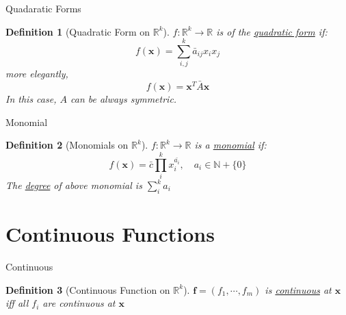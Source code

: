\documentclass[a4paper,11pt]{article}
\newtheorem{defn}{Definition}
\begin{document}
\begin{frame}[t]{Quadaratic Forms}
	\begin{defn}
		[Quadratic Form on $\mathbb{R}^k$]
		$f:\mathbb{R}^k\rightarrow\mathbb{R}$ is of the \uline{quadratic form} if:
		\[
			f(\mathbf{x})=\sum_{i,j}^k \bar a_{ij} x_i x_j
		\]more elegantly, 
		\[
			f(\mathbf{x}) = \mathbf{x}^T \bar A \mathbf{x}
		\]
		In this case, $A$ can be always symmetric.
	\end{defn}
\end{frame}
\begin{frame}[t]{Monomial}
	\begin{defn}
		[Monomials on $\mathbb{R}^k$]
		$f:\mathbb{R}^k\rightarrow\mathbb{R}$ is a \uline{monomial} if:\[
			f(\mathbf{x})= \bar c \prod_{i}^k x_i^{\bar{a_i}}, \quad a_i\in\mathbb{N}+\{0\}
		\]
		The \uline{degree} of above monomial is $\sum_i^k a_i$
	\end{defn}
\end{frame}

\section{Continuous Functions} %
\label{sec:continuous_functions}
\begin{frame}[t]{Continuous}
	\begin{defn}
		[Continuous Function on $\mathbb{R}^k$]
		$\mathbf{f}=(f_1,\cdots,f_m)$ is \uline{continuous} at $\mathbf{x}$ iff all $f_i$ are continuous at $\mathbf{x}$
	\end{defn}
\end{frame}

%
\end{document}

